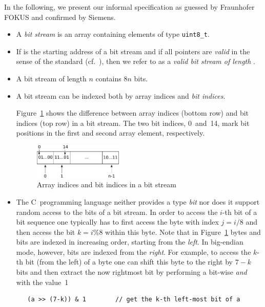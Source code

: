 

In the following, we present our informal 
specification as guessed by Fraunhofer
FOKUS and confirmed by Siemens.

\begin{itemize}
\item
A \emph{bit stream} is an array containing elements of type \verb"uint8_t".


\item
If  is the starting address of a bit stream and
if all pointers  are \emph{valid} in the sense
of the \isoc standard (cf.~\cite[\S~6.5.3.2(4)]{ISO:C99}),
then we refer to  as a \emph{valid bit stream of length }.

\item 
A bit stream of length $n$ contains $8n$ bits.

\item 
A bit stream can be indexed both by array indices
and \emph{bit indices}.

Figure~\ref{fig:bitstream-indices} shows the difference between 
array indices (bottom row) and bit indices (top row) in a bit stream.
The two bit indices, 0~and~14,
mark bit positions in the first and second array element, respectively.

\begin{figure}[hbt]
\begin{center}
\includegraphics[width=0.40\textwidth]{figures/array_as_stream.pdf}
\caption{\label{fig:bitstream-indices} Array indices and bit indices in a bit stream}
\end{center}
\end{figure}

\item 
The C~programming language neither provides a type \emph{bit}
nor does it support random access to the bits of a bit stream.
In order to access the $i$-th bit of a bit sequence one typically
has to first access the byte with index $j = i/8$ and then access the 
bit $k = i \% 8$ within this byte.
Note that in Figure~\ref{fig:bitstream-indices} 
bytes and bits are indexed in increasing order, starting from the \emph{left}.
In big-endian mode, however, bits are indexed from the \emph{right}.
For example, to access the $k$-th bit (from the left) of a byte  one can
shift this byte to the right by $7-k$ bits and then extract the now
rightmost bit by performing a bit-wise \emph{and} with the value~1
%
\begin{verbatim}
   (a >> (7-k)) & 1        // get the k-th left-most bit of a
\end{verbatim}


\end{itemize}

